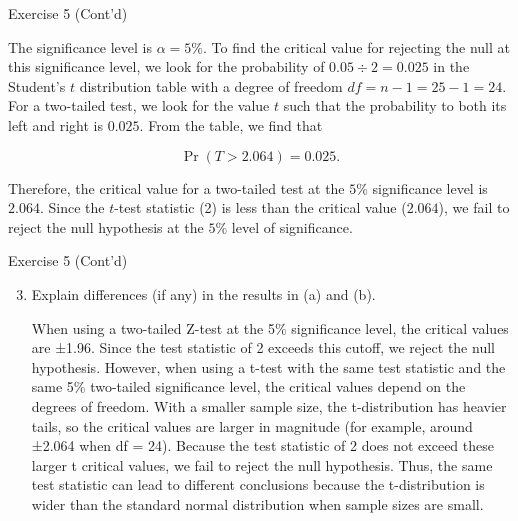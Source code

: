 \documentclass[
  ignorenonframetext,
  aspectratio=43,
]{beamer}
\let\olditem\item
\renewcommand\item{\olditem\justifying}
\begin{document}
\begin{frame}{Exercise 5 (Cont'd)}
\protect\hypertarget{exercise-5-contd-4}{}
\pause

The significance level is \(\alpha = 5\%\). To find the critical value
for rejecting the null at this significance level, we look for the
probability of \(0.05 \div 2 = 0.025\) in the Student's \(t\)
distribution table with a degree of freedom
\(df = n - 1 = 25 - 1 = 24\). For a two-tailed test, we look for the
value \(t\) such that the probability to both its left and right is
\(0.025\). From the table, we find that \vspace{-5pt}

\pause

\[
\Pr(T > 2.064) = 0.025.
\]

\pause

Therefore, the critical value for a two-tailed test at the \(5\%\)
significance level is \(2.064\). Since the \(t\)-test statistic (2) is
less than the critical value (\(2.064\)), we fail to reject the null
hypothesis at the \(5\%\) level of significance.
\end{frame}

\begin{frame}{Exercise 5 (Cont'd)}
\protect\hypertarget{exercise-5-contd-5}{}
\begin{enumerate}
\setcounter{enumi}{2}
\item
  Explain differences (if any) in the results in (a) and (b).

  \pause

  When using a two-tailed Z-test at the 5\% significance level, the
  critical values are ±1.96. Since the test statistic of 2 exceeds this
  cutoff, we reject the null hypothesis. However, when using a t-test
  with the same test statistic and the same 5\% two-tailed significance
  level, the critical values depend on the degrees of freedom. With a
  smaller sample size, the t-distribution has heavier tails, so the
  critical values are larger in magnitude (for example, around ±2.064
  when df = 24). Because the test statistic of 2 does not exceed these
  larger t critical values, we fail to reject the null hypothesis. Thus,
  the same test statistic can lead to different conclusions because the
  t-distribution is wider than the standard normal distribution when
  sample sizes are small.
\end{enumerate}
\end{frame}
\end{document}
